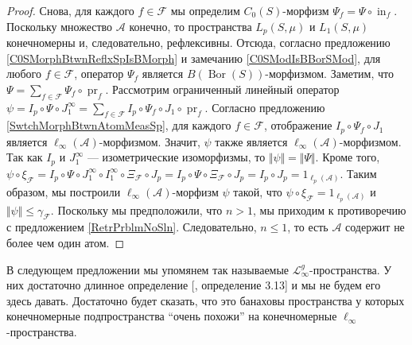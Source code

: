 \documentclass[12pt]{article}
\begin{document}
\begin{proof}
    Снова, для каждого $f\in\mathcal{F}$ мы определим 
    $C_0(S)$-морфизм $\Psi_f=\Psi\circ \operatorname{in}_f$. 
    Поскольку множество $\mathcal{A}$ конечно, то пространства $L_p(S,\mu)$ 
    и $L_1(S,\mu)$ конечномерны и, следовательно, рефлексивны. 
    Отсюда, согласно предложению \ref{C0SMorphBtwnReflxSpIsBMorph} и 
    замечанию \ref{C0SModIsBBorSMod}, для любого $f\in\mathcal{F}$, 
    оператор $\Psi_f$ является $B(\operatorname{Bor}(S))$-морфизмом. 
    Заметим, что
    $
        \Psi=\sum_{f\in\mathcal{F}} \Psi_f\circ\operatorname{pr}_f.
    $
    Рассмотрим ограниченный линейный оператор
    $
        \psi
        =I_p\circ\Psi\circ J_1^\infty
        =\sum_{f\in\mathcal{F}} 
            I_p\circ\Psi_f\circ J_1\circ\operatorname{pr}_f.
    $
    Согласно предложению \ref{SwtchMorphBtwnAtomMeasSp}, для 
    каждого $f\in \mathcal{F}$, отображение $I_p\circ \Psi_f\circ J_1$ является 
    $\ell_\infty(\mathcal{A})$-морфизмом. Значит, $\psi$ также является 
    $\ell_\infty(\mathcal{A})$-морфизмом. Так как $I_p$ 
    и $J_1^{\infty}$ --- изометрические изоморфизмы, 
    то $\Vert\psi\Vert=\Vert\Psi\Vert$. Кроме того,
    $
        \psi\circ\xi_\mathcal{F}
        = I_p\circ\Psi\circ J_1^{\infty}\circ 
            I_1^{\infty}\circ \Xi_{\mathcal{F}}\circ J_p
        = I_p\circ\Psi\circ \Xi_{\mathcal{F}}\circ J_p
        = I_p\circ J_p
        = 1_{\ell_p(\mathcal{A})}.
    $
    Таким образом, мы построили $\ell_\infty(\mathcal{A})$-морфизм $\psi$
    такой, что $\psi\circ\xi_{\mathcal{F}}=1_{\ell_p(\mathcal{A})}$ 
    и $\Vert \psi\Vert\leq\gamma_{\mathcal{F}}$. Поскольку мы предположили, 
    что $n>1$, мы приходим к противоречию с предложением \ref{RetrPrblmNoSln}. 
    Следовательно, $n\leq 1$, то есть $\mathcal{A}$ содержит не более чем один 
    атом.
\end{proof}

В следующем предложении мы упомянем так 
называемые $\mathscr{L}_\infty^g$-пространства. У них достаточно длинное 
определение [\cite{DefFloTensNorOpId}, определение 3.13] и мы не будем его 
здесь давать. Достаточно будет сказать, что это банаховы пространства у которых 
конечномерные подпространства ``очень похожи'' на 
конечномерные $\ell_\infty$-пространства. 
\end{document}
